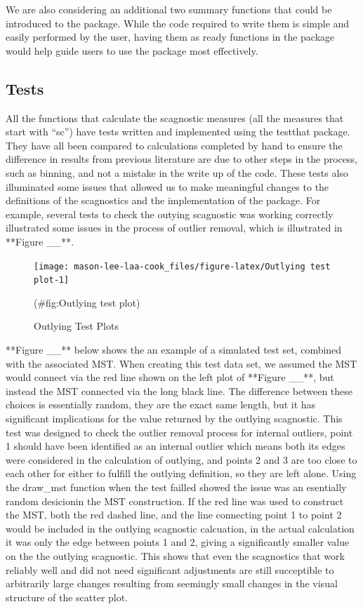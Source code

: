 We are also considering an additional two summary functions that could
be introduced to the package. While the code required to write them is
simple and easily performed by the user, having them as ready functions
in the package would help guide users to use the package most
effectively.

\hypertarget{tests}{%
\subsection{Tests}\label{tests}}

All the functions that calculate the scagnostic measures (all the
measures that start with ``sc'') have tests written and implemented
using the testthat package. They have all been compared to calculations
completed by hand to ensure the difference in results from previous
literature are due to other steps in the process, such as binning, and
not a mistake in the write up of the code. These tests also illuminated
some issues that allowed us to make meaningful changes to the
definitions of the scagnostics and the implementation of the package.
For example, several tests to check the outying scagnostic was working
correctly illustrated some issues in the process of outlier removal,
which is illustrated in **Figure \_\_**.

\begin{Schunk}
\begin{figure}
\texttt{[image: mason-lee-laa-cook\_files/figure-latex/Outlying test plot-1]} \caption[Outlying Test Plots]{Outlying Test Plots}(\#fig:Outlying test plot)
\end{figure}
\end{Schunk}

**Figure \_\_** below shows the an example of a simulated test set,
combined with the associated MST. When creating this test data set, we
assumed the MST would connect via the red line shown on the left plot of
**Figure \_\_**, but instead the MST connected via the long black line.
The difference between these choices is essentially random, they are the
exact same length, but it has significant implications for the value
returned by the outlying scagnostic. This test was designed to check the
outlier removal process for internal outliers, point 1 should have been
identified as an internal outlier which means both its edges were
considered in the calculation of outlying, and points 2 and 3 are too
close to each other for either to fulfill the outlying definition, so
they are left alone. Using the draw\_mst function when the test failled
showed the issue was an esentially random desicionin the MST
construction. If the red line was used to construct the MST, both the
red dashed line, and the line connecting point 1 to point 2 would be
included in the outlying scagnostic calcuation, in the actual
calculation it was only the edge between points 1 and 2, giving a
significantly smaller value on the the outlying scagnostic. This shows
that even the scagnostics that work reliably well and did not need
significant adjustments are still succeptible to arbitrarily large
changes resulting from seemingly small changes in the visual structure
of the scatter plot.

